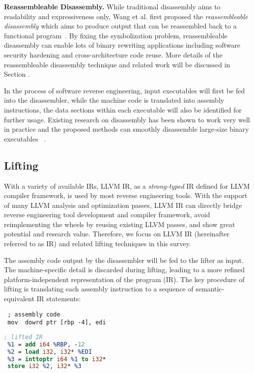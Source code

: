 \noindent \textbf{Reassembleable Disassembly.} While traditional disassembly
aims to readability and expressiveness only, Wang et al. first proposed the
\textit{reassembleable disassembly} which aims to produce output that can be
reassembled back to a functional program~\cite{wang2015reassembleable}. By
fixing the symbolization problem, reassembleable disassembly can enable lots
of binary rewriting applications including software security hardening and
cross-architecture code reuse. More details of the reassembleable disassembly
technique and related work will be discussed in Section .

In the process of software reverse engineering, input executables will first be
fed into the disassembler, while the machine code is translated into assembly
instructions, the data sections within each executable will also be identified
for further usage. Existing research on disassembly has been shown to work
very well in practice and the proposed methods can smoothly disassemble
large-size binary executables
~\cite{balakrishnan2010wysinwyx,kruegel2004static,wang2015reassembleable}.

\subsection{Lifting} \label{subsec:background-lifting}

With a variety of available IRs, LLVM IR, as a \textit{strong-typed} IR
defined for LLVM compiler framework, is used by most reverse engineering
tools. With the support of many LLVM analysis and optimization passes, LLVM IR
can directly bridge reverse engineering tool development and compiler
framework, avoid reimplementing the wheels by reusing existing LLVM passes,
and show great potential and research value. Therefore, we focus on LLVM IR
(hereinafter referred to as IR) and related lifting techniques in this survey.

The assembly code output by the disassembler will be fed to the lifter as
input. The machine-specific detail is discarded during lifting, leading to a
more refined platform-independent representation of the program (IR). The key
procedure of lifting is translating each assembly instruction to a sequence of
semantic-equivalent IR statements:

\vspace*{3pt}
\noindent\hspace*{36pt}\begin{minipage}{.40\linewidth}
\begin{lstlisting}
 ; assembly code
 mov  dowrd ptr [rbp -4], edi
\end{lstlisting}
\end{minipage}\hspace*{24pt}
\begin{minipage}{.40\linewidth}
\begin{lstlisting}[language=llvm]
 ; lifted IR
 %1 = add i64 %RBP, -12
 %2 = load i32, i32* %EDI
 %3 = inttoptr i64 %1 to i32*
 store i32 %2, i32* %3
\end{lstlisting}
\end{minipage}


